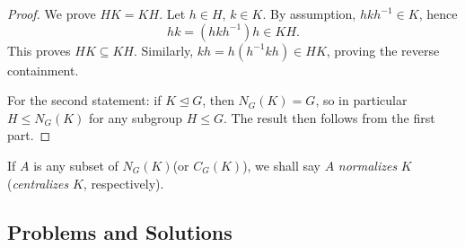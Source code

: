\begin{proof}
    We prove \( HK = KH \). Let \( h \in H \), \( k \in K \). By assumption, \( hkh^{-1} \in K \), hence
    \[
    hk = (hkh^{-1})h \in KH.
    \]
    This proves \( HK \subseteq KH \). Similarly, \( kh = h(h^{-1}kh) \in HK \), proving the reverse containment. 
    
    For the second statement: if \( K \trianglelefteq G \), then \( N_G(K) = G \), so in particular \( H \leq N_G(K) \)
    for any subgroup \( H \leq G \). The result then follows from the first part.
\end{proof}

\begin{definition}
    If $A$ is any subset of $N_G(K)$(or $C_G(K)$), we shall say $A$ \textit{normalizes} $K$(\textit{centralizes} $K$, respectively). 
\end{definition}

\eject

\subsection*{Problems and Solutions}

